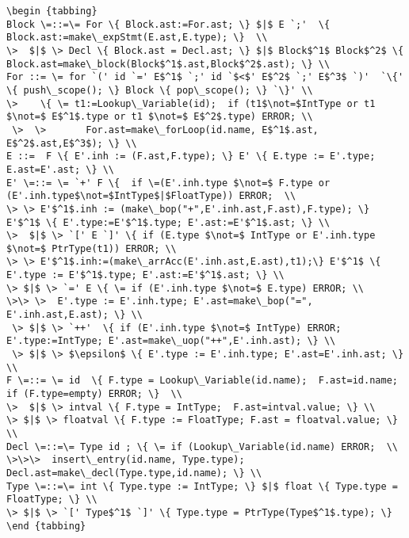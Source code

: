 \documentclass[11pt]{article}
\begin{document}
\begin {verbatim}
\begin {tabbing}
Block \=::=\= For \{ Block.ast:=For.ast; \} $|$ E `;'  \{ Block.ast:=make\_expStmt(E.ast,E.type); \}  \\
\>  $|$ \> Decl \{ Block.ast = Decl.ast; \} $|$ Block$^1$ Block$^2$ \{ Block.ast=make\_block(Block$^1$.ast,Block$^2$.ast); \} \\
For ::= \= for `(' id `=' E$^1$ `;' id `$<$' E$^2$ `;' E$^3$ `)'  `\{' \{ push\_scope(); \} Block \{ pop\_scope(); \} `\}' \\  
\>    \{ \= t1:=Lookup\_Variable(id);  if (t1$\not=$IntType or t1 $\not=$ E$^1$.type or t1 $\not=$ E$^2$.type) ERROR; \\
 \>  \>       For.ast=make\_forLoop(id.name, E$^1$.ast, E$^2$.ast,E$^3$); \} \\
E ::=  F \{ E'.inh := (F.ast,F.type); \} E' \{ E.type := E'.type; E.ast=E'.ast; \} \\
E' \=::= \= `+' F \{  if \=(E'.inh.type $\not=$ F.type or (E'.inh.type$\not=$IntType$|$FloatType)) ERROR;  \\
\> \> E'$^1$.inh := (make\_bop("+",E'.inh.ast,F.ast),F.type); \} E'$^1$ \{ E'.type:=E'$^1$.type; E'.ast:=E'$^1$.ast; \} \\
\>  $|$ \> `[' E `]' \{ if (E.type $\not=$ IntType or E'.inh.type $\not=$ PtrType(t1)) ERROR; \\ 
\> \> E'$^1$.inh:=(make\_arrAcc(E'.inh.ast,E.ast),t1);\} E'$^1$ \{ E'.type := E'$^1$.type; E'.ast:=E'$^1$.ast; \} \\
\> $|$ \> `=' E \{ \= if (E'.inh.type $\not=$ E.type) ERROR; \\
\>\> \>  E'.type := E'.inh.type; E'.ast=make\_bop("=", E'.inh.ast,E.ast); \} \\
 \> $|$ \> `++'  \{ if (E'.inh.type $\not=$ IntType) ERROR; E'.type:=IntType; E'.ast=make\_uop("++",E'.inh.ast); \} \\
 \> $|$ \> $\epsilon$ \{ E'.type := E'.inh.type; E'.ast=E'.inh.ast; \} \\
F \=::= \= id  \{ F.type = Lookup\_Variable(id.name);  F.ast=id.name; if (F.type=empty) ERROR; \}  \\
\>  $|$ \> intval \{ F.type = IntType;  F.ast=intval.value; \} \\
\> $|$ \> floatval \{ F.type := FloatType; F.ast = floatval.value; \} \\
Decl \=::=\= Type id ; \{ \= if (Lookup\_Variable(id.name) ERROR;  \\
\>\>\>  insert\_entry(id.name, Type.type); Decl.ast=make\_decl(Type.type,id.name); \} \\
Type \=::=\= int \{ Type.type := IntType; \} $|$ float \{ Type.type = FloatType; \} \\
\> $|$ \> `[' Type$^1$ `]' \{ Type.type = PtrType(Type$^1$.type); \}
\end {tabbing}



\end{verbatim}
\end{document}
